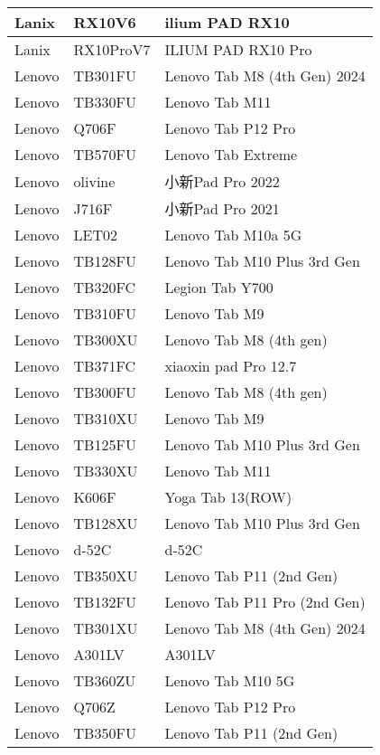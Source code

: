 \begin{tabularx}{\linewidth}{|l|X|X|}
        Lanix & RX10V6 & ilium PAD RX10 \\ \hline
        Lanix & RX10ProV7 & ILIUM PAD RX10 Pro \\ \hline
        Lenovo & TB301FU & Lenovo Tab M8 (4th Gen) 2024 \\ \hline
        Lenovo & TB330FU & Lenovo Tab M11 \\ \hline
        Lenovo & Q706F & Lenovo Tab P12 Pro \\ \hline
        Lenovo & TB570FU & Lenovo Tab Extreme \\ \hline
        Lenovo & olivine & 小新Pad Pro 2022 \\ \hline
        Lenovo & J716F & 小新Pad Pro 2021 \\ \hline
        Lenovo & LET02 & Lenovo Tab M10a 5G \\ \hline
        Lenovo & TB128FU & Lenovo Tab M10 Plus 3rd Gen \\ \hline
        Lenovo & TB320FC & Legion Tab Y700 \\ \hline
        Lenovo & TB310FU & Lenovo Tab M9 \\ \hline
        Lenovo & TB300XU & Lenovo Tab M8 (4th gen) \\ \hline
        Lenovo & TB371FC & xiaoxin pad Pro 12.7 \\ \hline
        Lenovo & TB300FU & Lenovo Tab M8 (4th gen) \\ \hline
        Lenovo & TB310XU & Lenovo Tab M9 \\ \hline
        Lenovo & TB125FU & Lenovo Tab M10 Plus 3rd Gen \\ \hline
        Lenovo & TB330XU & Lenovo Tab M11 \\ \hline
        Lenovo & K606F & Yoga Tab 13(ROW) \\ \hline
        Lenovo & TB128XU & Lenovo Tab M10 Plus 3rd Gen \\ \hline
        Lenovo & d-52C & d-52C \\ \hline
        Lenovo & TB350XU & Lenovo Tab P11 (2nd Gen) \\ \hline
        Lenovo & TB132FU & Lenovo Tab P11 Pro (2nd Gen) \\ \hline
        Lenovo & TB301XU & Lenovo Tab M8 (4th Gen) 2024 \\ \hline
        Lenovo & A301LV & A301LV \\ \hline
        Lenovo & TB360ZU & Lenovo Tab M10 5G \\ \hline
        Lenovo & Q706Z & Lenovo Tab P12 Pro \\ \hline
        Lenovo & TB350FU & Lenovo Tab P11 (2nd Gen) \\ \hline

\end{tabularx}
